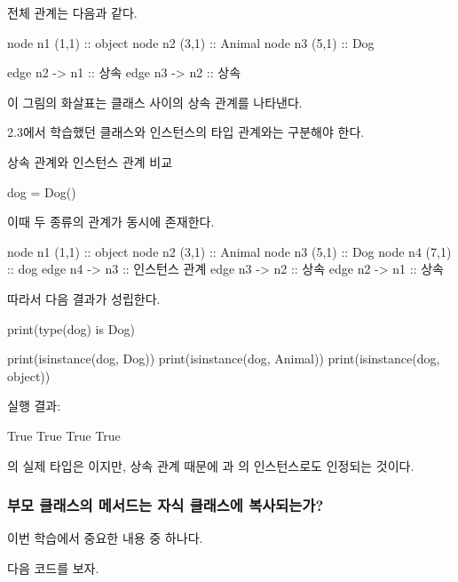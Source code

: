 전체 관계는 다음과 같다.

\begin{dhkdiagram}[in=10]
node n1 (1,1) :: object
node n2 (3,1) :: Animal
node n3 (5,1) :: Dog

edge n2 -> n1 :: 상속
edge n3 -> n2 :: 상속
\end{dhkdiagram}

이 그림의 화살표는 클래스 사이의 상속 관계를 나타낸다.

2.3에서 학습했던 클래스와 인스턴스의 타입 관계와는 구분해야 한다.

\begin{dhknote}
\begin{dhksmry}[centered]
상속 관계와 인스턴스 관계 비교
\end{dhksmry}
\end{dhknote}

\begin{dhkcode}
dog = Dog()
\end{dhkcode}

이때 두 종류의 관계가 동시에 존재한다.

\begin{dhkdiagram}[in=10]
node n1 (1,1) :: object
node n2 (3,1) :: Animal
node n3 (5,1) :: Dog
node n4 (7,1) :: dog
edge n4 -> n3 :: 인스턴스 관계
edge n3 -> n2 :: 상속
edge n2 -> n1 :: 상속
\end{dhkdiagram}

따라서 다음 결과가 성립한다.

\begin{dhkcode}
print(type(dog) is Dog)

print(isinstance(dog, Dog))
print(isinstance(dog, Animal))
print(isinstance(dog, object))
\end{dhkcode}

실행 결과:

\begin{dhkzsh}
True
True
True
True
\end{dhkzsh}

의 실제 타입은 이지만, 상속 관계 때문에 과 의 인스턴스로도 인정되는 것이다.

\subsubsection{부모 클래스의 메서드는 자식 클래스에 복사되는가?}

이번 학습에서 중요한 내용 중 하나다.

다음 코드를 보자.


